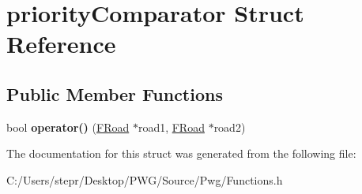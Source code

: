 \hypertarget{structpriority_comparator}{}\section{priority\+Comparator Struct Reference}
\label{structpriority_comparator}
\subsection*{Public Member Functions}
\begin{DoxyCompactItemize}
\item 
\mbox{\label{structpriority_comparator_a774ffa3286dafd87cb99cb114bdf9670}} 
bool {\bfseries operator()} (\mbox{\hyperlink{struct_f_road}{F\+Road}} $\ast$road1, \mbox{\hyperlink{struct_f_road}{F\+Road}} $\ast$road2)
\end{DoxyCompactItemize}


The documentation for this struct was generated from the following file\+:\begin{DoxyCompactItemize}
\item 
C\+:/\+Users/stepr/\+Desktop/\+P\+W\+G/\+Source/\+Pwg/Functions.\+h\end{DoxyCompactItemize}
